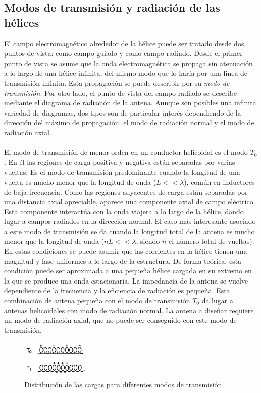 \documentclass[12pt]{article}
\begin{document}
\subsection{Modos de transmisión y radiación de las hélices}
El campo electromagnético alrededor de la hélice puede ser tratado desde dos puntos de vista: como campo guiado y como campo radiado. Desde el primer punto de vista se asume que la onda electromagnética se propaga sin atenuación a lo largo de una hélice infinita, del mismo modo que lo haría por una linea de transmisión infinita. Esta propagación se puede describir por su \textit{modo de transmisión}. Por otro lado, el punto de vista del campo radiado se describe mediante el diagrama de radiación de la antena. Aunque son posibles una infinita variedad de diagramas, dos tipos son de particular interés dependiendo de la dirección del máximo de propagación: el modo de radiación normal y el modo de radiación axial.\\\\
El modo de transmisión de menor orden en un conductor helicoidal es el modo $T_{0}$. En él las regiones de carga positiva y negativa están separadas por varias vueltas. Es el modo de transmisión predominante cuando la longitud de una vuelta es mucho menor que la longitud de onda ($L<<\lambda$), común en inductores de baja frecuencia. Como las regiones adyacentes de carga están separadas por una distancia axial apreciable, aparece una componente axial de campo eléctrico. Esta componente interactúa con la onda viajera a lo largo de la hélice, dando lugar a campos radiados en la dirección normal. El caso más interesante asociado a este modo de transmisión se da cuando la longitud total de la antena es mucho menor que la longitud de onda ($nL<<\lambda$, siendo $n$ el número total de vueltas). En estas condiciones se puede asumir que las corrientes en la hélice tienen una magnitud y fase uniformes a lo largo de la estructura. De forma teórica, esta condición puede ser aproximada a una pequeña hélice cargada en su extremo en la que se produce una onda estacionaria. La impedancia de la antena se vuelve dependiente de la frecuencia y la eficiencia de radiación es pequeña. Esta combinación de antena pequeña con el modo de transmisión $T_{0}$ da lugar a antenas helicoidales con modo de radiación normal. La antena a diseñar requiere un modo de radiación axial, que no puede ser conseguido con este modo de transmisión.\\

\begin{figure}[h]
	\centering
	\includegraphics[width=0.3\textwidth]{modos.png}
	\caption{Distribución de las cargas para diferentes modos de transmisión}
	\label{fig:modes}
\end{figure}
\end{document}
